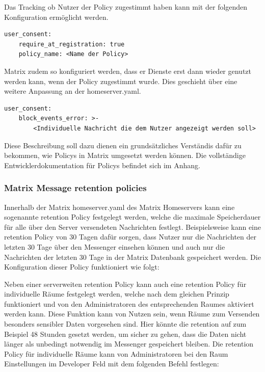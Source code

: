 Das Tracking ob Nutzer der Policy zugestimmt haben kann mit der folgenden Konfiguration ermöglicht werden.

\begin{lstlisting}
user_consent:
    require_at_registration: true
    policy_name: <Name der Policy>
\end{lstlisting}

Matrix zudem so konfiguriert werden, dass er Dienste erst dann wieder genutzt werden kann, wenn der Policy zugestimmt wurde.
Dies geschieht über eine weitere Anpassung an der homeserver.yaml.

\begin{lstlisting}
user_consent:
    block_events_error: >-
        <Individuelle Nachricht die dem Nutzer angezeigt werden soll>
\end{lstlisting}

Diese Beschreibung soll dazu dienen ein grundsätzliches Verständis dafür zu bekommen, wie Policys in Matrix umgesetzt werden können. Die vollständige Entwicklerdokumentation für Policys befindet sich im Anhang.

\subsubsection{Matrix Message retention policies}\label{chapter:vdmf}
Innerhalb der Matrix homeserver.yaml des Matrix Homeservers kann eine sogenannte retention Policy festgelegt werden, welche die maximale Speicherdauer für alle über den Server versendeten Nachrichten festlegt. Beispielsweise kann eine retention Policy von 30 Tagen dafür sorgen, dass Nutzer nur die Nachrichten der letzten 30 Tage über den Messenger einsehen können und auch nur die Nachrichten der letzten 30 Tage in der Matrix Datenbank gespeichert werden. Die Konfiguration dieser Policy funktioniert wie folgt:

Neben einer serverweiten retention Policy kann auch eine retention Policy für individuelle Räume festgelegt werden, welche nach dem gleichen Prinzip funktioniert und von den Administratoren des entsprechenden Raumes aktiviert werden kann. Diese Funktion kann von Nutzen sein, wenn Räume zum Versenden besonders sensibler Daten vorgesehen sind. Hier könnte die retention auf zum Beispiel 48 Stunden gesetzt werden, um sicher zu gehen, dass die Daten nicht länger als unbedingt notwendig im Messenger gespeichert bleiben. Die retention Policy für individuelle Räume kann von Administratoren bei den Raum Einstellungen im Developer Feld mit dem folgenden Befehl festlegen:

